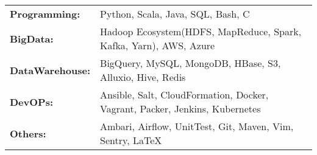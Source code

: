 \begin{flushleft}
\begin{tabular}{@{} l p{6cm} @{}}
  \textbf{Programming:} & Python, Scala, Java, SQL, Bash, C\\
  \textbf{BigData:} & Hadoop Ecosystem(HDFS, MapReduce, Spark, Kafka, Yarn), AWS, Azure\\
  \textbf{DataWarehouse:} & BigQuery, MySQL, MongoDB, HBase, S3, Alluxio, Hive, Redis\\
  \textbf{DevOPs:} & Ansible, Salt, CloudFormation, Docker, Vagrant, Packer, Jenkins, Kubernetes\\
  \textbf{Others:} & Ambari, Airflow, UnitTest, Git, Maven, Vim, Sentry, \LaTeX
\end{tabular}
\end{flushleft}


%
%
%
%
%
%
